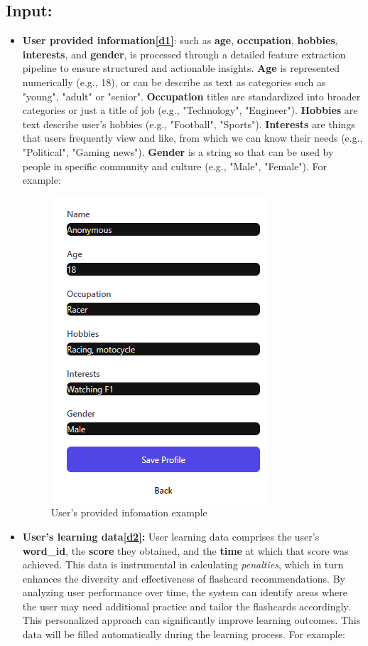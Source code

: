 \documentclass{article}
\begin{document}
\subsection{Input:}
\begin{itemize}
    \label{sec:input1}
    \item \textbf{User provided information\hyperref[sec:input1]{[d1]}}: such as \textbf{age}, \textbf{occupation}, \textbf{hobbies}, \textbf{interests}, and \textbf{gender}, is processed through a detailed feature extraction pipeline to ensure structured and actionable insights. 
    \textbf{Age} is represented numerically (e.g., 18), or can be describe as text as categories such as "young", "adult" or "senior". \textbf{Occupation} titles are standardized into broader categories or just a title of job (e.g., "Technology", "Engineer").  \textbf{Hobbies} are text describe user's hobbies (e.g., "Football", "Sports"). \textbf{Interests} are things that users frequently view and like, from which we can know their needs (e.g., "Political", "Gaming news"). \textbf{Gender} is a string so that can be used by people in specific community and culture (e.g., "Male", "Female"). For example:
    \begin{figure}[h!]
        \centering
        \includegraphics[width=0.3\linewidth]{user-profile.png}
        \caption{User's provided infomation example}
        \label{fig:enter-label}
    \end{figure}
    \label{sec:input2}
    \item \textbf{User's learning data\hyperref[sec:input2]{[d2]}:} User learning data comprises the user's \textbf{word\_id}, the \textbf{score} they obtained, and the \textbf{time} at which that score was achieved. This data is instrumental in calculating \textit{penalties}, which in turn enhances the diversity and effectiveness of flashcard recommendations. By analyzing user performance over time, the system can identify areas where the user may need additional practice and tailor the flashcards accordingly. This personalized approach can significantly improve learning outcomes. This data will be filled automatically during the learning process. For example:

\end{itemize}
\end{document}
